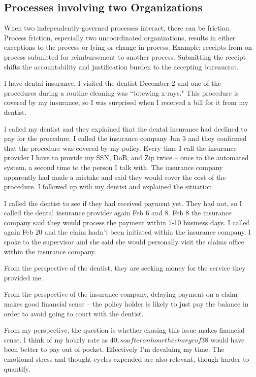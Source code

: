 \subsection{Processes involving two Organizations}

When two independently-governed processes interact, there can be friction. Process friction, especially two uncoordinated organizations, results in either exceptions to the process or lying or change in process. 
Example: receipts from on process submitted for reimbursement to another process.
Submitting the receipt shifts the accountability and justification burden to the accepting bureaucrat.




I have dental insurance. I visited the dentist December 2 and one of the procedures during a routine cleaning was ``bitewing x-rays." This procedure is covered by my insurance, so I was surprised when I received a bill for it from my dentist.

I called my dentist and they explained that the dental insurance had declined to pay for the procedure. I called the insurance company Jan 3 and they confirmed that the procedure was covered by my policy. 
Every time I call the insurance provider I have to provide my SSN, DoB, and Zip twice -- once to the automated system, a second time to the person I talk with. The insurance company apparently had made a mistake and said they would cover the cost of the procedure. I followed up with my dentist and explained the situation.

I called the dentist to see if they had received payment yet. They had not, so I called the dental insurance provider again Feb 6 and 8. Feb 8 the insurance company said they would process the payment within 7-10 business days. I called again Feb 20 and the claim hadn't been initiated within the insurance company. I spoke to the supervisor and she said she would personally visit the claims office within the insurance company.

From the perspective of the dentist, they are seeking money for the service they provided me.

From the perspective of the insurance company, delaying payment on a claim makes good financial sense -- the policy holder is likely to just pay the balance in order to avoid going to court with the dentist.

From my perspective, the question is whether chasing this issue makes financial sense. I think of my hourly rate as $40, so after an hour the charge of $38 would have been better to pay out of pocket. Effectively I'm devaluing my time. The emotional stress and thought-cycles expended are also relevant, though harder to quantify.
